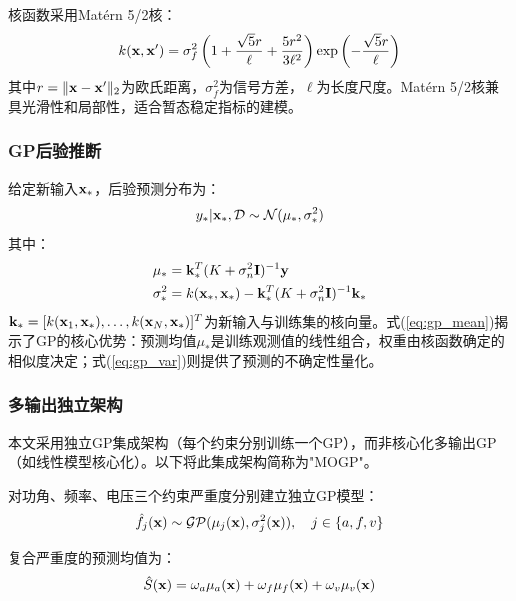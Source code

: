 核函数采用Matérn 5/2核：
\begin{equation}
    k(\mathbf{x}, \mathbf{x}') = \sigma_f^2 \left(1 + \frac{\sqrt{5}r}{\ell} + \frac{5r^2}{3\ell^2}\right) \exp\left(-\frac{\sqrt{5}r}{\ell}\right)
    \label{eq:matern}
\end{equation}
其中$r = \|\mathbf{x} - \mathbf{x}'\|_2$为欧氏距离，$\sigma_f^2$为信号方差，$\ell$为长度尺度。Matérn 5/2核兼具光滑性和局部性，适合暂态稳定指标的建模\cite{ye2024parallel_gp}。

\subsubsection{GP后验推断}

给定新输入$\mathbf{x}_*$，后验预测分布为：
\begin{equation}
    y_* | \mathbf{x}_*, \mathcal{D} \sim \mathcal{N}(\mu_*, \sigma_*^2)
    \label{eq:gp_posterior}
\end{equation}
其中：
\begin{align}
    \mu_* &= \mathbf{k}_*^T (K + \sigma_n^2 \mathbf{I})^{-1} \mathbf{y} \label{eq:gp_mean} \\
    \sigma_*^2 &= k(\mathbf{x}_*, \mathbf{x}_*) - \mathbf{k}_*^T (K + \sigma_n^2 \mathbf{I})^{-1} \mathbf{k}_* \label{eq:gp_var}
\end{align}
$\mathbf{k}_* = [k(\mathbf{x}_1, \mathbf{x}_*), \ldots, k(\mathbf{x}_N, \mathbf{x}_*)]^T$为新输入与训练集的核向量。式(\ref{eq:gp_mean})揭示了GP的核心优势：预测均值$\mu_*$是训练观测值的线性组合，权重由核函数确定的相似度决定；式(\ref{eq:gp_var})则提供了预测的不确定性量化。

\subsubsection{多输出独立架构}

本文采用独立GP集成架构（每个约束分别训练一个GP），而非核心化多输出GP（如线性模型核心化）。以下将此集成架构简称为"MOGP"。

对功角、频率、电压三个约束严重度分别建立独立GP模型：
\begin{equation}
    \hat{f}_j(\mathbf{x}) \sim \mathcal{GP}(\mu_j(\mathbf{x}), \sigma_j^2(\mathbf{x})), \quad j \in \{a, f, v\}
    \label{eq:mogp}
\end{equation}

复合严重度的预测均值为：
\begin{equation}
    \hat{S}(\mathbf{x}) = \omega_a \mu_a(\mathbf{x}) + \omega_f \mu_f(\mathbf{x}) + \omega_v \mu_v(\mathbf{x})
    \label{eq:composite_mean}
\end{equation}

